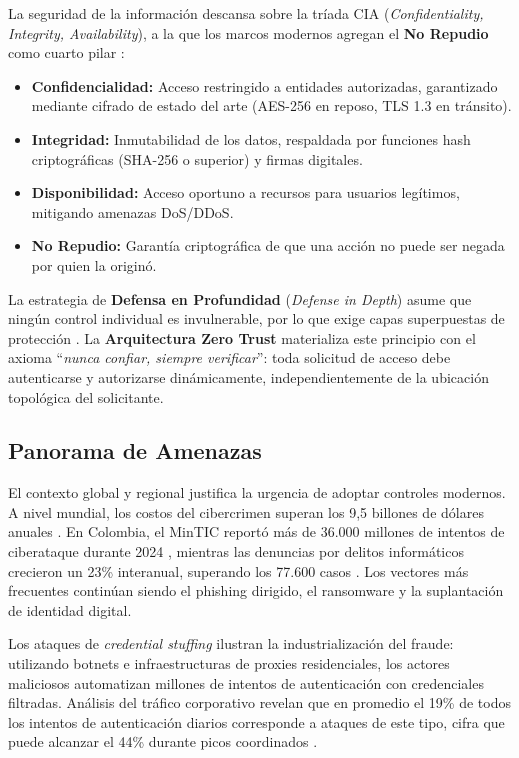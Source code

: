 \documentclass[12pt, a4paper]{article}
\begin{document}
La seguridad de la información descansa sobre la tríada CIA (\textit{Confidentiality,
Integrity, Availability}), a la que los marcos modernos agregan el
\textbf{No Repudio} como cuarto pilar \cite{iso27001}:

\begin{itemize}[noitemsep]
  \item \textbf{Confidencialidad:} Acceso restringido a entidades autorizadas,
        garantizado mediante cifrado de estado del arte (AES-256 en reposo,
        TLS 1.3 en tránsito).
  \item \textbf{Integridad:} Inmutabilidad de los datos, respaldada por
        funciones hash criptográficas (SHA-256 o superior) y firmas digitales.
  \item \textbf{Disponibilidad:} Acceso oportuno a recursos para usuarios
        legítimos, mitigando amenazas DoS/DDoS.
  \item \textbf{No Repudio:} Garantía criptográfica de que una acción no puede
        ser negada por quien la originó.
\end{itemize}

La estrategia de \textbf{Defensa en Profundidad} (\textit{Defense in Depth})
asume que ningún control individual es invulnerable, por lo que exige capas
superpuestas de protección \cite{iso27001}. La \textbf{Arquitectura Zero Trust}
\cite{zerotrust2025,nistZTA} materializa este principio con el axioma
``\textit{nunca confiar, siempre verificar}'': toda solicitud de acceso debe
autenticarse y autorizarse dinámicamente, independientemente de la ubicación
topológica del solicitante.

\subsection{Panorama de Amenazas}

El contexto global y regional justifica la urgencia de adoptar controles modernos.
A nivel mundial, los costos del cibercrimen superan los 9,5 billones de dólares
anuales \cite{authx2025}. En Colombia, el MinTIC reportó más de 36.000 millones
de intentos de ciberataque durante 2024 \cite{acis2024}, mientras las denuncias
por delitos informáticos crecieron un 23\% interanual, superando los 77.600 casos
\cite{ccit2024}. Los vectores más frecuentes continúan siendo el phishing dirigido,
el ransomware y la suplantación de identidad digital.

Los ataques de \textit{credential stuffing} ilustran la industrialización del
fraude: utilizando botnets e infraestructuras de proxies residenciales, los
actores maliciosos automatizan millones de intentos de autenticación con
credenciales filtradas. Análisis del tráfico corporativo revelan que en promedio
el 19\% de todos los intentos de autenticación diarios corresponde a ataques de
este tipo, cifra que puede alcanzar el 44\% durante picos coordinados
\cite{verizon2025}.
\end{document}
